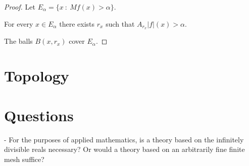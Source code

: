 \begin{proof}
  Let $E_\alpha = \{x ~:~ M f(x) > \alpha\}$.

  For every $x \in E_\alpha$ there exists $r_x$ such that $A_{r_x} |f|(x) > \alpha$.

  The balls $B(x, r_x)$ cover $E_\alpha$.


\end{proof}


\section{Topology}




\section{Questions}

- For the purposes of applied mathematics, is a theory based on the infinitely divisible reals necessary? Or
would a theory based on an arbitrarily fine finite mesh suffice?
